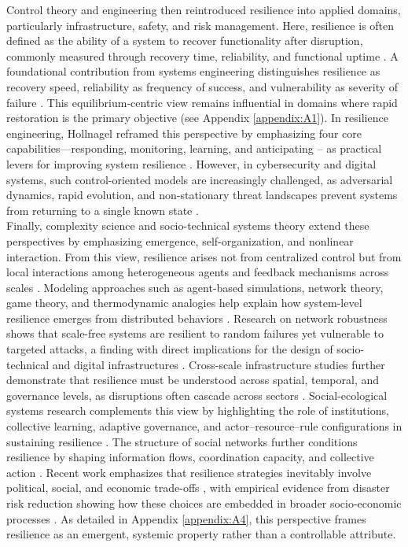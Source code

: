 Control theory and engineering then reintroduced resilience into applied domains, particularly infrastructure, safety, and risk management. Here, resilience is often defined as the ability of a system to recover functionality after disruption, commonly measured through recovery time, reliability, and functional uptime \autocite{bruneau2003framework}. A foundational contribution from systems engineering distinguishes resilience as recovery speed, reliability as frequency of success, and vulnerability as severity of failure \autocite{hashimoto1982reliability}. This equilibrium-centric view remains influential in domains where rapid restoration is the primary objective (see Appendix \ref{appendix:A1}). In resilience engineering, Hollnagel reframed this perspective by emphasizing four core capabilities—responding, monitoring, learning, and anticipating -- as practical levers for improving system resilience \autocite{hollnagel2013resilience}. However, in cybersecurity and digital systems, such control-oriented models are increasingly challenged, as adversarial dynamics, rapid evolution, and non-stationary threat landscapes prevent systems from returning to a single known state \autocite{dupont2019cyberresilience}.\\

Finally, complexity science and socio-technical systems theory extend these perspectives by emphasizing emergence, self-organization, and nonlinear interaction. From this view, resilience arises not from centralized control but from local interactions among heterogeneous agents and feedback mechanisms across scales \autocite{levin1998ecosystems, krakovska2024resilience}. Modeling approaches such as agent-based simulations, network theory, game theory, and thermodynamic analogies help explain how system-level resilience emerges from distributed behaviors \autocite{myerson2013game, albert2000error, gao2016universal}. Research on network robustness shows that scale-free systems are resilient to random failures yet vulnerable to targeted attacks, a finding with direct implications for the design of socio-technical and digital infrastructures \autocite{albert2000error}. Cross-scale infrastructure studies further demonstrate that resilience must be understood across spatial, temporal, and governance levels, as disruptions often cascade across sectors \autocite{moreno2018womens}. Social-ecological systems research complements this view by highlighting the role of institutions, collective learning, adaptive governance, and actor–resource–rule configurations in sustaining resilience \autocite{berkes2000linking, anderies2004framework, adger2005socialecological}. The structure of social networks further conditions resilience by shaping information flows, coordination capacity, and collective action \autocite{bodin2009role}. Recent work emphasizes that resilience strategies inevitably involve political, social, and economic trade-offs \autocite{leichenko2024climate}, with empirical evidence from disaster risk reduction showing how these choices are embedded in broader socio-economic processes \autocite{aase2020resilience}. As detailed in Appendix \ref{appendix:A4}, this perspective frames resilience as an emergent, systemic property rather than a controllable attribute.\\

